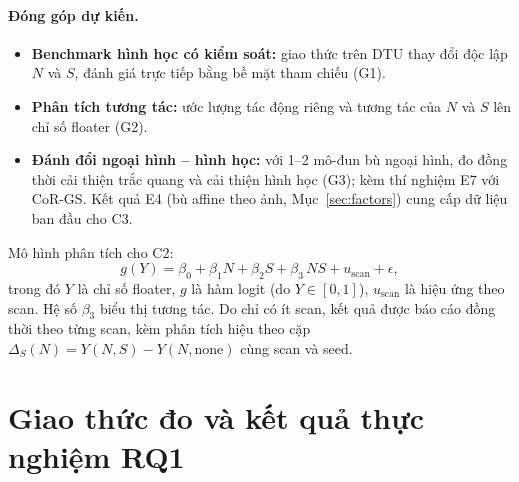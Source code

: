 \documentclass[11pt,a4paper]{article}
\begin{document}
\paragraph{Đóng góp dự kiến.}
\label{sec:contrib}
\begin{itemize}
  \item[\textbf{C1.}] \textbf{Benchmark hình học có kiểm soát:} giao thức trên DTU thay đổi độc lập $N$ và $S$, đánh giá trực tiếp bằng bề mặt tham chiếu (G1).
  \item[\textbf{C2.}] \textbf{Phân tích tương tác:} ước lượng tác động riêng và tương tác của $N$ và $S$ lên chỉ số floater (G2).
  \item[\textbf{C3.}] \textbf{Đánh đổi ngoại hình -- hình học:} với 1--2 mô-đun bù ngoại hình, đo đồng thời cải thiện trắc quang và cải thiện hình học (G3); kèm thí nghiệm E7 với CoR-GS. Kết quả E4 (bù affine theo ảnh, Mục~\ref{sec:factors}) cung cấp dữ liệu ban đầu cho C3.
\end{itemize}
Mô hình phân tích cho C2:
\begin{equation}
g(Y) = \beta_0+\beta_1N+\beta_2S+\beta_3\,N S+u_{\text{scan}}+\epsilon,
\end{equation}
trong đó $Y$ là chỉ số floater, $g$ là hàm logit (do $Y\in[0,1]$), $u_{\text{scan}}$ là hiệu ứng theo scan. Hệ số $\beta_3$ biểu thị tương tác. Do chỉ có ít scan, kết quả được báo cáo đồng thời theo từng scan, kèm phân tích hiệu theo cặp $\Delta_S(N)=Y(N,S)-Y(N,\text{none})$ cùng scan và seed.

\section{Giao thức đo và kết quả thực nghiệm RQ1}
\label{sec:pilot}
\end{document}
